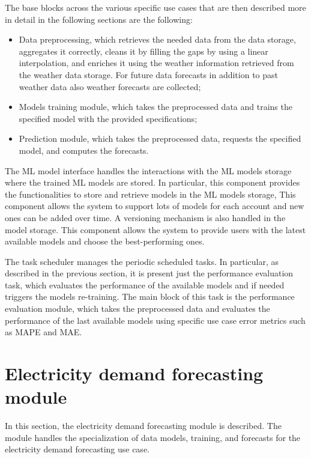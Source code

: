 The base blocks across the various specific use cases that are then described more in detail in the following sections are the following:
\begin{itemize}
  \item Data preprocessing, which retrieves the needed data from the data storage, aggregates it correctly, cleans it by filling the gaps by using a linear interpolation, and enriches it using the weather information retrieved from the weather data storage. For future data forecasts in addition to past weather data also weather forecasts are collected;
  \item Models training module, which takes the preprocessed data and trains the specified model with the provided specifications;
  \item Prediction module, which takes the preprocessed data, requests the specified model, and computes the forecasts.
\end{itemize}

The ML model interface handles the interactions with the ML models storage where the trained ML models are stored.
In particular, this component provides the functionalities to store and retrieve models in the ML models storage,
This component allows the system to support lots of models for each account and new ones can be added over time.
A versioning mechanism is also handled in the model storage.
This component allows the system to provide users with the latest available models and choose the best-performing ones.

The task scheduler manages the periodic scheduled tasks.
In particular, as described in the previous section, it is present just the performance evaluation task, which evaluates the performance of the available models and if needed triggers the models re-training.
The main block of this task is the performance evaluation module, which takes the preprocessed data and evaluates the performance of the last available models using specific use case error metrics such as MAPE and MAE.


\section{Electricity demand forecasting module}
\label{sec:demandmodel}
\vspace{0.2 cm}

In this section, the electricity demand forecasting module is described.
The module handles the specialization of data models, training, and forecasts for the electricity demand forecasting use case.

